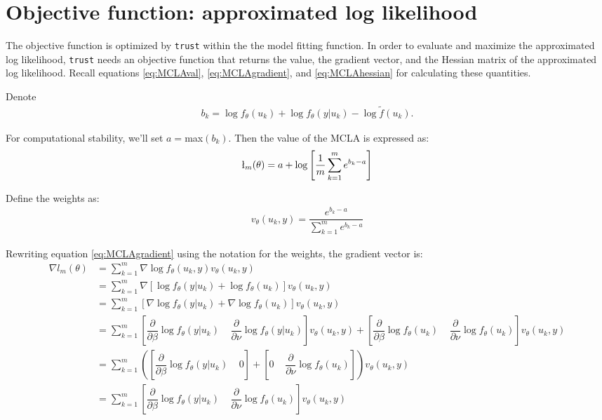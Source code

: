 \documentclass{article}
\begin{document}
\section{Objective function: approximated log likelihood}\label{sec:objfun}
The objective function is optimized by \texttt{trust} within the the model fitting function.  In order to evaluate and maximize the approximated log likelihood, \texttt{trust} needs an objective function that returns the value, the gradient vector, and the Hessian matrix of the approximated log likelihood.  Recall equations \ref{eq:MCLAval}, \ref{eq:MCLAgradient}, and \ref{eq:MCLAhessian}   for calculating these quantities.  

Denote
\begin{align}
b_k = \log f_\theta (u_k) + \log f_\theta (y|u_k) - \log \tilde{f} (u_k). \label{eq:MCLA}
\end{align}


For computational stability, we'll set $a=$max$(b_k)$. Then the value of the MCLA is expressed as:\\
\begin{align}
\l_m (\theta) = a+ \log \left[ \dfrac{1}{m}  \sum_{k=1}^m e^{b_k-a} \right]
\end{align}

Define the weights as:
\begin{align}
v_\theta(u_k,y) = \dfrac{e^{b_k-a}}{ \sum_{k=1}^m e^{b_k-a}} 
\end{align}

Rewriting equation \ref{eq:MCLAgradient} using the notation for the weights, the gradient vector is: 
\begin{align}
\nabla l_m(\theta) &= \sum_{k=1}^m  \nabla \log f_\theta (u_k,y) v_\theta(u_k,y)\\ \label{eq:gradient}
&= \sum_{k=1}^m \nabla \left[  \log f_\theta(y|u_k) + \log f_\theta (u_k)   \right] v_\theta(u_k,y)\\
&= \sum_{k=1}^m  \left[ \nabla \log f_\theta(y|u_k) + \nabla\log f_\theta (u_k)  \right] v_\theta(u_k,y)\\
&= \sum_{k=1}^m  \left[ \dfrac{\partial}{\partial \beta} \log f_\theta(y|u_k) \; \; \; \;  \dfrac{\partial}{\partial \nu} \log f_\theta(y|u_k) \right] v_\theta(u_k,y)+ \left[ \dfrac{\partial}{\partial \beta} \log f_\theta(u_k) \; \; \; \; \dfrac{\partial}{\partial \nu} \log f_\theta(u_k) \right] v_\theta(u_k,y)\\
&=  \sum_{k=1}^m \left(  \left[ \dfrac{\partial}{\partial \beta} \log f_\theta(y|u_k) \; \; \; \; 0 \right] + \left[ 0 \; \; \; \; \dfrac{\partial}{\partial \nu} \log f_\theta(u_k) \right]   \right) v_\theta(u_k,y)   \\
&= \sum_{k=1}^m  \left[ \dfrac{\partial}{\partial \beta} \log f_\theta(y|u_k) \; \; \; \;  \dfrac{\partial}{\partial \nu} \log f_\theta(u_k)  \right] v_\theta(u_k,y) \label{eq:MCLAgr}
\end{align}
\end{document}
